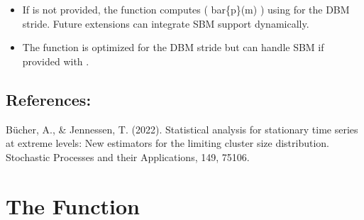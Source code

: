 \documentclass[a4paper,11pt,openany,english]{sphinxmanual}
\begin{document}
\begin{fulllineitems}
\begin{itemize}
\item {} 
\sphinxAtStartPar
If  is not provided, the function computes ( bar\{p\}(m) ) using  
for the DBM stride. Future extensions can integrate SBM support dynamically.

\item {} 
\sphinxAtStartPar
The function is optimized for the DBM stride but can handle SBM if provided with .

\end{itemize}


\subsection{References:}
\label{\detokenize{api_biascorrection:id12}}
\sphinxAtStartPar
Bücher, A., \& Jennessen, T. (2022). Statistical analysis for stationary time series 
at extreme levels: New estimators for the limiting cluster size distribution. 
Stochastic Processes and their Applications, 149, 75\sphinxhyphen{}106.

\end{fulllineitems}



\section{The  Function}
\label{\detokenize{api_biascorrection:the-upsilon-function}}
\end{document}
